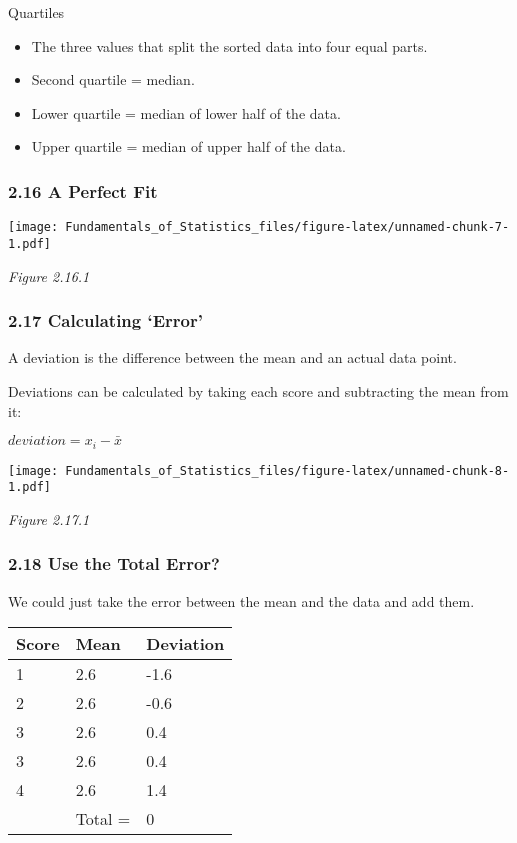 \documentclass[]{article}
\providecommand{\tightlist}{%
  \setlength{\itemsep}{0pt}\setlength{\parskip}{0pt}}
\begin{document}
Quartiles

\begin{itemize}
\tightlist
\item
  The three values that split the sorted data into four equal parts.
\item
  Second quartile = median.
\item
  Lower quartile = median of lower half of the data.
\item
  Upper quartile = median of upper half of the data.
\end{itemize}

\hypertarget{a-perfect-fit}{%
\subsubsection{2.16 A Perfect Fit}\label{a-perfect-fit}}

\texttt{[image: Fundamentals\_of\_Statistics\_files/figure-latex/unnamed-chunk-7-1.pdf]}

\emph{Figure 2.16.1}

\hypertarget{calculating-error}{%
\subsubsection{2.17 Calculating `Error'}\label{calculating-error}}

A deviation is the difference between the mean and an actual data point.

Deviations can be calculated by taking each score and subtracting the
mean from it:

\(deviation = x_i - \bar{x}\)

\texttt{[image: Fundamentals\_of\_Statistics\_files/figure-latex/unnamed-chunk-8-1.pdf]}

\emph{Figure 2.17.1}

\hypertarget{use-the-total-error}{%
\subsubsection{2.18 Use the Total Error?}\label{use-the-total-error}}

We could just take the error between the mean and the data and add them.

\begin{longtable}[]{@{}lll@{}}
\toprule
Score & Mean & Deviation\tabularnewline
\midrule
\endhead
1 & 2.6 & -1.6\tabularnewline
2 & 2.6 & -0.6\tabularnewline
3 & 2.6 & 0.4\tabularnewline
3 & 2.6 & 0.4\tabularnewline
4 & 2.6 & 1.4\tabularnewline
& Total = & 0\tabularnewline
\bottomrule
\end{longtable}
\end{document}
